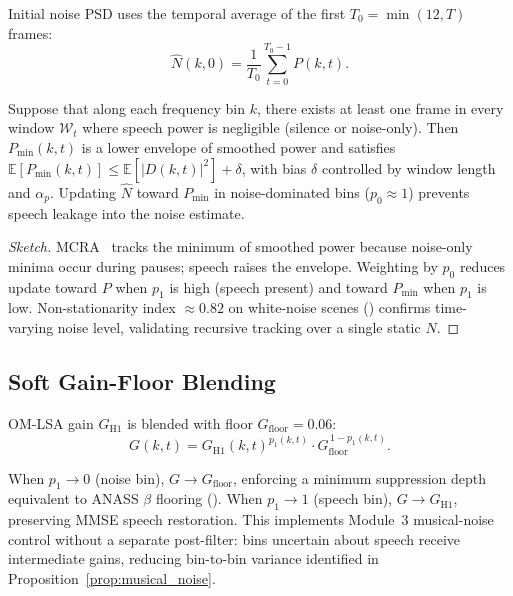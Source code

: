 Initial noise PSD uses the temporal average of the first $T_0=\min(12,T)$ frames:
\begin{equation}
  \hat{N}(k,0) = \frac{1}{T_0}\sum_{t=0}^{T_0-1} P(k,t).
  \label{eq:noise_init}
\end{equation}

\begin{proposition}
\label{prop:mcra}
Suppose that along each frequency bin $k$, there exists at least one frame in every window $\mathcal{W}_t$ where speech power is negligible (silence or noise-only). Then $P_{\min}(k,t)$ is a lower envelope of smoothed power and satisfies $\mathbb{E}[P_{\min}(k,t)] \le \mathbb{E}[|D(k,t)|^2] + \delta$, with bias $\delta$ controlled by window length and $\alpha_p$. Updating $\hat{N}$ toward $P_{\min}$ in noise-dominated bins ($p_0\approx 1$) prevents speech leakage into the noise estimate.
\end{proposition}

\begin{proof}[Sketch]
MCRA~\cite{loizou2013} tracks the minimum of smoothed power because noise-only minima occur during pauses; speech raises the envelope. Weighting by $p_0$ reduces update toward $P$ when $p_1$ is high (speech present) and toward $P_{\min}$ when $p_1$ is low. Non-stationarity index $\approx 0.82$ on white-noise scenes () confirms time-varying noise level, validating recursive tracking over a single static $\hat{N}$.
\end{proof}

\subsection{Soft Gain-Floor Blending}

OM-LSA gain $G_{\mathrm{H1}}$ is blended with floor $G_{\mathrm{floor}}=0.06$:
\begin{equation}
  G(k,t) = G_{\mathrm{H1}}(k,t)^{p_1(k,t)} \cdot G_{\mathrm{floor}}^{\,1-p_1(k,t)}.
  \label{eq:gain_blend}
\end{equation}

\begin{remark}
When $p_1\to 0$ (noise bin), $G\to G_{\mathrm{floor}}$, enforcing a minimum suppression depth equivalent to ANASS $\beta$ flooring (). When $p_1\to 1$ (speech bin), $G\to G_{\mathrm{H1}}$, preserving MMSE speech restoration. This implements Module~3 musical-noise control without a separate post-filter: bins uncertain about speech receive intermediate gains, reducing bin-to-bin variance identified in Proposition~\ref{prop:musical_noise}.
\end{remark}

